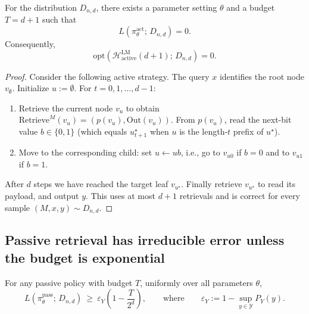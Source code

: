 \begin{lemma} \label{lem:active}
For the distribution \(D_{n,d}\), there exists a parameter setting \(\theta\) and a budget \(T=d+1\) such that
\[
L\!\left(\pi^{\mathrm{act}}_\theta;\, D_{n,d}\right)=0.
\]
Consequently,
\[
\mathrm{opt}\!\left(\mathcal{H}^{\mathrm{LM}}_{\mathrm{active}}(d+1);\, D_{n,d}\right)=0.
\]
\end{lemma}

\begin{proof}
Consider the following active strategy. The query \(x\) identifies the root node \(v_\emptyset\).
Initialize \(u:=\emptyset\). For \(t=0,1,\dots,d-1\):
\begin{enumerate}
\item Retrieve the current node \(v_u\) to obtain \(\mathrm{Retrieve}^M(v_u)=(p(v_u),\mathrm{Out}(v_u))\).
From \(p(v_u)\), read the next-bit value \(b\in\{0,1\}\) (which equals \(u^\star_{t+1}\) when \(u\) is the length-\(t\)
prefix of \(u^\star\)).
\item Move to the corresponding child: set \(u \leftarrow u b\), i.e., go to \(v_{u0}\) if \(b=0\) and to \(v_{u1}\) if
\(b=1\).
\end{enumerate}
After \(d\) steps we have reached the target leaf \(v_{u^\star}\). Finally retrieve \(v_{u^\star}\)  to read its payload, and output \(y\). This uses at most \(d+1\) retrievals and is
correct for every sample \((M,x,y)\sim D_{n,d}\).
\end{proof}


\subsection{Passive retrieval has irreducible error unless the budget is exponential}

\begin{lemma} \label{lem:passive}
For any passive policy with budget \(T\), uniformly over all parameters \(\theta\),
\[
L\!\left(\pi^{\mathrm{pass}}_\theta;\, D_{n,d}\right)\ \ge\ \varepsilon_Y\!\left(1-\frac{T}{2^d}\right),
\qquad\text{where}\qquad
\varepsilon_Y := 1 - \sup_{y\in\mathcal{Y}} P_Y(y).
\]
\end{lemma}

